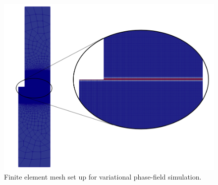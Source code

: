 \begin{figure}
\centering
\includegraphics[width=1\linewidth]{figures/VPF_ME3-3_init.png}
\caption{Finite element mesh set up for variational phase-field simulation.}
\label{fig:ME3-3_pressrue_VPF_init}
\end{figure}

